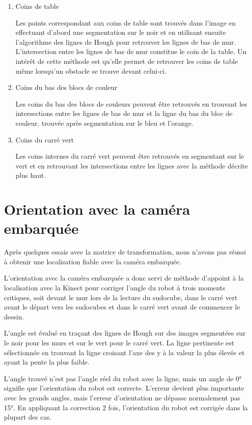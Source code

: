 \begin{enumerate}
\item{Coins de table}

Les points correspondant aux coins de table sont trouvés dans l'image en effectuant d'abord une segmentation sur le noir et en utilisant ensuite l'algorithme des lignes de Hough pour retrouver les lignes de bas de mur. L'intersection entre les lignes de bas de mur constitue le coin de la table. Un intérêt de cette méthode est qu'elle permet de retrouver les coins de table même lorsqu'un obstacle se trouve devant celui-ci.

\item{Coins du bas des blocs de couleur}

Les coins du bas des blocs de couleurs peuvent être retrouvés en trouvant les intersections entre les lignes de bas de mur et la ligne du bas du bloc de couleur, trouvée après segmentation sur le bleu et l'orange.

\item{Coins du carré vert}

Les coins internes du carré vert peuvent être retrouvés en segmentant sur le vert et en retrouvant les intersections entre les lignes avec la méthode décrite plus haut.
\end{enumerate}

\section{Orientation avec la caméra embarquée}

Après quelques essais avec la matrice de transformation, nous n'avons pas réussi à obtenir une localisation fiable avec la caméra embarquée. 

L'orientation avec la caméra embarquée a donc servi de méthode d'appoint à la localisation avec la Kinect pour corriger l'angle du robot à trois moments critiques, soit devant le mur lors de la lecture du sudocube, dans le carré vert avant le départ vers les sudocubes et dans le carré vert avant de commencer le dessin. 

L'angle est évalué en traçant des lignes de Hough sur des images segmentées sur le noir pour les murs et sur le vert pour le carré vert. La ligne pertinente est sélectionnée en trouvant la ligne croisant l'axe des y à la valeur la plus élevée et ayant la pente la plus faible. 

L'angle trouvé n'est pas l'angle réel du robot avec la ligne, mais un angle de 0° signifie que l'orientation du robot est correcte. L'erreur devient plus importante avec les grands angles, mais l'erreur d'orientation ne dépasse normalement pas 15°. En appliquant la correction 2 fois, l'orientation du robot est corrigée dans la plupart des cas.

